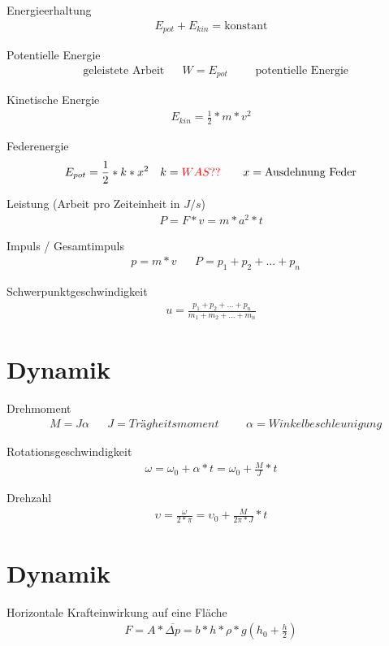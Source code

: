 \documentclass[17pt]{extarticle}
\begin{document}
	Energieerhaltung
	\begin{align}
		E_{pot} + E_{kin} = \text{konstant}
	\end{align}
	
	Potentielle Energie
	\begin{align}
		&\text{geleistete Arbeit} 
		&&W = E_{pot} 
		&&&\text{potentielle Energie}
	\end{align}
	
	Kinetische Energie
	\begin{align}
		E_{kin} = \frac{1}{2} * m * v^{2}
	\end{align}
	
	Federenergie
	\begin{align}
		&E_{pot} = \frac{1}{2} * k * x^{2}
		&&k = \textcolor{red}{WAS??}
		&&&x = \text{Ausdehnung Feder}
	\end{align}
	
	Leistung \small(Arbeit pro Zeiteinheit in $J/s$)
	\begin{align}
		P = F * v = m * a^{2} * t
	\end{align}
	
	Impuls / Gesamtimpuls
	\begin{align}
		&p = m * v
		&&P = p_{1} + p_{2} + ... + p_{n}
	\end{align}
	
	Schwerpunktgeschwindigkeit
	\begin{align}
		u = \frac{p_{1} + p_{2} + ... + p_{n}}{m_{1} + m_{2} + ... + m_{n}}
	\end{align}
	
\section{Dynamik}
	Drehmoment
	\begin{align}
		&M = J \alpha
		&&J = Trägheitsmoment
		&&&\alpha = Winkelbeschleunigung
	\end{align}
	
	Rotationsgeschwindigkeit
	\begin{align}
		\omega = \omega_{0} + \alpha * t = \omega_{0} + \frac{M}{J} * t
	\end{align}
	
	Drehzahl
	\begin{align}
		\upsilon = \frac{\omega}{2 * \pi} = \upsilon_{0} + \frac{M}{2\pi * J} * t 
	\end{align}

\section{Dynamik}
	Horizontale Krafteinwirkung auf eine Fläche
	\begin{align}
		F = A * \overline{\Delta p} = b*h * \rho*g (h_{0} + \frac{h}{2})
	\end{align}
	
\end{document}
